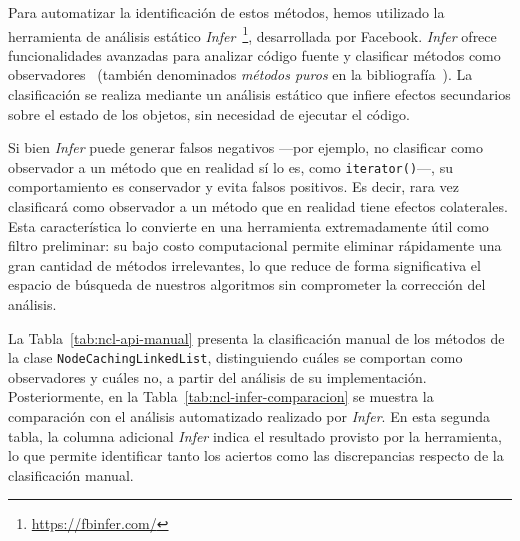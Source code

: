 Para automatizar la identificación de estos métodos, hemos utilizado la herramienta de análisis estático \emph{Infer}~\footnote{\url{https://fbinfer.com/}}, desarrollada por Facebook. 
\emph{Infer} ofrece funcionalidades avanzadas para analizar código fuente y clasificar métodos como observadores~\cite{Huang:2012} (también denominados \emph{métodos puros} en la bibliografía~\cite{Salcianu:2005}).
La clasificación se realiza mediante un análisis estático que infiere efectos secundarios sobre el estado de los objetos, sin necesidad de ejecutar el código.

Si bien \emph{Infer} puede generar falsos negativos —por ejemplo, no clasificar como observador a un método que en realidad sí lo es, como \texttt{iterator()}—, su comportamiento es conservador y evita falsos positivos. 
Es decir, rara vez clasificará como observador a un método que en realidad tiene efectos colaterales. 
Esta característica lo convierte en una herramienta extremadamente útil como filtro preliminar: su bajo costo computacional permite eliminar rápidamente una gran cantidad de métodos irrelevantes, 
lo que reduce de forma significativa el espacio de búsqueda de nuestros algoritmos sin comprometer la corrección del análisis.

La Tabla~\ref{tab:ncl-api-manual} presenta la clasificación manual de los métodos de la clase 
\texttt{NodeCachingLinkedList}, distinguiendo cuáles se comportan como observadores y cuáles no, 
a partir del análisis de su implementación. 
Posteriormente, en la Tabla~\ref{tab:ncl-infer-comparacion} se muestra la comparación con el análisis 
automatizado realizado por \emph{Infer}. 
En esta segunda tabla, la columna adicional \emph{Infer} indica el resultado provisto por la herramienta, 
lo que permite identificar tanto los aciertos como las discrepancias respecto de la clasificación manual.

